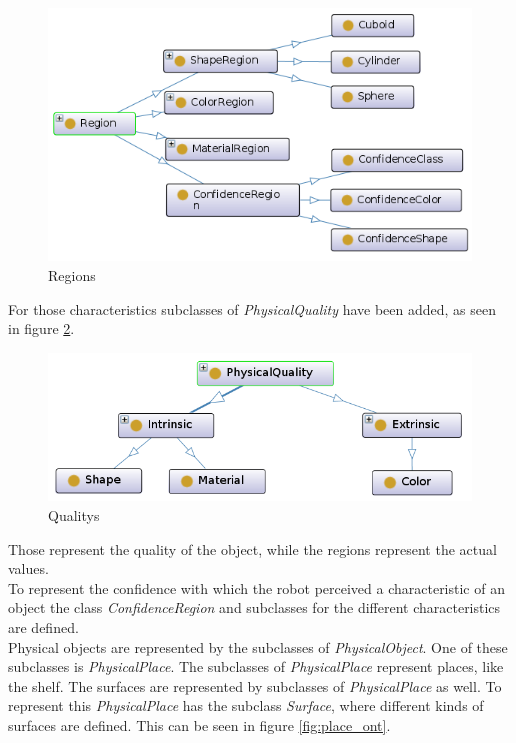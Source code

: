 \documentclass[main.tex]{subfiles}
\begin{document}
\begin{figure}
\centering
\includegraphics[width=1.0\textwidth]{pictures/ontology/Ontologie_region}
\caption{Regions}
\label{fig:region_ont}
\end{figure}

For those characteristics subclasses of \textit{PhysicalQuality} have been added, as seen in figure \ref{fig:quality_ont}.

\begin{figure}
\centering
\includegraphics[width=1.0\textwidth]{pictures/ontology/Ontologie_quality}
\caption{Qualitys}
\label{fig:quality_ont}
\end{figure}

 Those represent the quality of the object, while the regions represent the actual values.\\
To represent the confidence with which the robot perceived a characteristic of an object the class \textit{ConfidenceRegion} and subclasses for the different characteristics are defined.\\
Physical objects are represented by the subclasses of \textit{PhysicalObject}.
One of these subclasses is \textit{PhysicalPlace}. The subclasses of \textit{PhysicalPlace} represent places, like the shelf. The surfaces are represented by subclasses of \textit{PhysicalPlace} as well. To represent this \textit{PhysicalPlace} has the subclass \textit{Surface}, where different kinds of surfaces are defined. This can be seen in figure \ref{fig:place_ont}.
\end{document}
